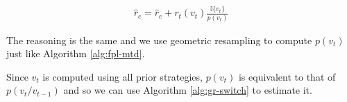 \begin{align*}
    \hat{r}_{c} = \hat{r}_c + r_t(v_t)\frac{\mathbb{I}\{v_t\}}{p(v_t)}
\end{align*}


The reasoning is the same and we use geometric resampling to compute $p(v_t)$ just like Algorithm \ref{alg:fpl-mtd}.

Since $v_t$ is computed using all prior strategies, $p(v_t)$ is equivalent to that of $p(v_t/v_{t-1})$ and so we can use Algorithm \ref{alg:gr-switch} to estimate it.
\fi
